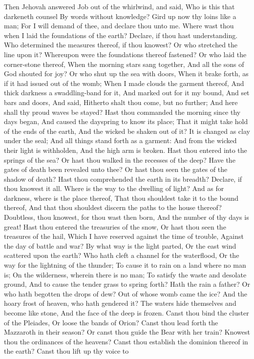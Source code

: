Then Jehovah answered Job out of the whirlwind, and said,  Who is this that darkeneth counsel By words without knowledge?  Gird up now thy loins like a man; For I will demand of thee, and declare thou unto me.  Where wast thou when I laid the foundations of the earth? Declare, if thou hast understanding.  Who determined the measures thereof, if thou knowest? Or who stretched the line upon it?  Whereupon were the foundations thereof fastened? Or who laid the corner-stone thereof,  When the morning stars sang together, And all the sons of God shouted for joy?  Or who shut up the sea with doors, When it brake forth, as if it had issued out of the womb;  When I made clouds the garment thereof, And thick darkness a swaddling-band for it,  And marked out for it my bound, And set bars and doors,  And said, Hitherto shalt thou come, but no further; And here shall thy proud waves be stayed?  Hast thou commanded the morning since thy days began, And caused the dayspring to know its place;  That it might take hold of the ends of the earth, And the wicked be shaken out of it?  It is changed as clay under the seal; And all things stand forth as a garment:  And from the wicked their light is withholden, And the high arm is broken.  Hast thou entered into the springs of the sea? Or hast thou walked in the recesses of the deep?  Have the gates of death been revealed unto thee? Or hast thou seen the gates of the shadow of death?  Hast thou comprehended the earth in its breadth? Declare, if thou knowest it all.  Where is the way to the dwelling of light? And as for darkness, where is the place thereof,  That thou shouldest take it to the bound thereof, And that thou shouldest discern the paths to the house thereof?  Doubtless, thou knowest, for thou wast then born, And the number of thy days is great!  Hast thou entered the treasuries of the snow, Or hast thou seen the treasures of the hail,  Which I have reserved against the time of trouble, Against the day of battle and war?  By what way is the light parted, Or the east wind scattered upon the earth?  Who hath cleft a channel for the waterflood, Or the way for the lightning of the thunder;  To cause it to rain on a land where no man is; On the wilderness, wherein there is no man;  To satisfy the waste and desolate ground, And to cause the tender grass to spring forth?  Hath the rain a father? Or who hath begotten the drops of dew?  Out of whose womb came the ice? And the hoary frost of heaven, who hath gendered it?  The waters hide themselves and become like stone, And the face of the deep is frozen.  Canst thou bind the cluster of the Pleiades, Or loose the bands of Orion?  Canst thou lead forth the Mazzaroth in their season? Or canst thou guide the Bear with her train?  Knowest thou the ordinances of the heavens? Canst thou establish the dominion thereof in the earth?  Canst thou lift up thy voice to 